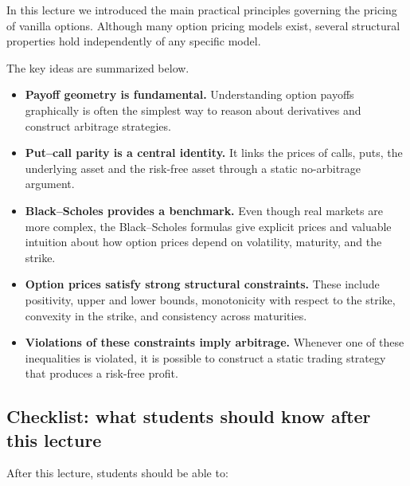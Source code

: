\documentclass[11pt]{article}
\newcommand{\1}{\mathbf{1}}
\theoremstyle{plain}
\theoremstyle{definition}
\theoremstyle{remark}
\begin{document}
In this lecture we introduced the main practical principles governing
the pricing of vanilla options.  
Although many option pricing models exist, several structural properties
hold independently of any specific model.

The key ideas are summarized below.

\begin{itemize}[leftmargin=1.4em]
    \item \textbf{Payoff geometry is fundamental.}  
    Understanding option payoffs graphically is often the simplest way
    to reason about derivatives and construct arbitrage strategies.

    \item \textbf{Put--call parity is a central identity.}  
    It links the prices of calls, puts, the underlying asset and the
    risk-free asset through a static no-arbitrage argument.

    \item \textbf{Black--Scholes provides a benchmark.}  
    Even though real markets are more complex, the Black--Scholes formulas
    give explicit prices and valuable intuition about how option prices
    depend on volatility, maturity, and the strike.

    \item \textbf{Option prices satisfy strong structural constraints.}  
    These include positivity, upper and lower bounds, monotonicity with
    respect to the strike, convexity in the strike, and consistency
    across maturities.

    \item \textbf{Violations of these constraints imply arbitrage.}  
    Whenever one of these inequalities is violated, it is possible to
    construct a static trading strategy that produces a risk-free profit.
\end{itemize}

\subsection{Checklist: what students should know after this lecture}

After this lecture, students should be able to:
\end{document}
